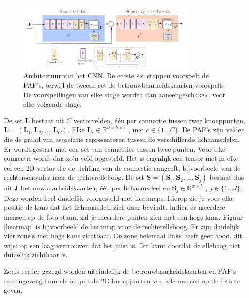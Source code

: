 \documentclass[a4paper,twoside,kulak]{kulakreport}
\begin{document}
\begin{figure}[H]
	\centering
	\includegraphics[width=0.8\textwidth]{algoritme_architectuur}
	\caption{Architectuur van het CNN. De eerste set stappen voorspelt de PAF's, terwijl de tweede set de betrouwbaarheidskaarten voorspelt. De voorspellingen van elke stage worden dan aaneengeschakeld voor elke volgende stage. \cite{cao2019openpose}}
	\label{algoritme}
\end{figure}

De set \textbf{L} bestaat uit $C$ vectorvelden, één per connectie tussen twee knooppunten, $\textbf{L} = (\textbf{L}_1,\textbf{L}_2,...,\textbf{L}_C)$. Elke $\textbf{L}_c \in \mathbb{R}^{w \times h \times 2}$ , met $c \in \{1...C\}.$ De PAF’s  zijn velden die de graad van associatie representeren tussen de verschillende lichaamsdelen. Er wordt gestart met een set van connecties tussen twee punten. Voor elke connectie wordt dan zo’n veld opgesteld. Het is eigenlijk een tensor met in elke cel een 2D-vector die de richting van de connectie aangeeft, bijvoorbeeld van de rechterschouder naar de rechterelleboog.
De set $\textbf{S} = (\textbf{S}_1,\textbf{S}_2,...,\textbf{S}_j)$ bestaat dus uit $\textbf{J}$ betrouwbaarheidskaarten, één per lichaamsdeel en $\textbf{S}_j \in \mathbb{R} ^{w \times h}$ , $j \in \{1...J\}$.
Deze worden heel duidelijk voorgesteld met heatmaps. Hierop zie je voor elke positie de kans dat het lichaamsdeel zich daar bevindt. Indien er meerdere mensen op de foto staan, zal je meerdere punten zien met een hoge kans. Figuur \ref{heatmap} is bijvoorbeeld de heatmap voor de rechterelleboog. Er zijn duidelijk vier zone's met hoge kans zichtbaar. De zone helemaal links heeft geen rood, dit wijst op een laag vertrouwen dat het juist is. Dit komt doordat de elleboog niet duidelijk zichtbaar is.

Zoals eerder gezegd worden uiteindelijk de betrouwbaarheidskaarten en PAF's samengevoegd om als output de 2D-knooppunten van alle mensen op de foto te geven.
\end{document}

